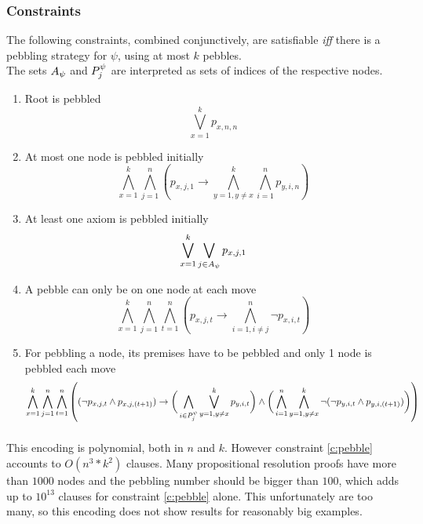 \documentclass{llncs}
\begin{document}
\subsubsection*{Constraints}
The following constraints, combined conjunctively, are satisfiable \textit{iff} there is a pebbling strategy for $\psi$, using at most $k$ pebbles.\\
The sets $A_{\psi}$ and $P_{j}^{\psi}$ are interpreted as sets of indices of the respective nodes.

\begin{enumerate}
	\item Root is pebbled
				$$\bigvee_{x = 1}^k p_{x,n,n}$$
				
	\item At most one node is pebbled initially\\
				$$\bigwedge_{x = 1}^k \bigwedge_{j = 1}^n \left( p_{x,j,1} \rightarrow \bigwedge_{y = 1, y \neq x}^k \bigwedge_{i = 1}^n p_{y,i,n} \right)$$
	
	\item At least one axiom is pebbled initially\\
				$$\bigvee_{x = 1}^k \bigvee_{j \in A_{\psi}} p_{x,j,1}$$
				
	\item A pebble can only be on one node at each move
				$$\bigwedge_{x = 1}^k \bigwedge_{j = 1}^n \bigwedge_{t = 1}^n \left( p_{x,j,t} \rightarrow \bigwedge_{i = 1, i \neq j}^n \neg p_{x,i,t} \right)$$ 
				
	\item \label{c:pebble} For pebbling a node, its premises have to be pebbled and only 1 node is pebbled each move\\
				$$\bigwedge_{x = 1}^k \bigwedge_{j = 1}^n \bigwedge_{t = 1}^n \left( (\neg p_{x,j,t} \wedge p_{x,j,(t+1)} ) \rightarrow 
					\bigg( \bigwedge_{i \in P_{j}^{\psi}} \bigvee_{y = 1, y \neq x}^k p_{y,i,t} \bigg) \wedge 
					\bigg( \bigwedge_{i = 1}^n \bigwedge_{y = 1, y \neq x}^k \neg ( \neg p_{y,i,t} \wedge p_{y,i,(t+1)} ) \bigg) \right)$$
				
\end{enumerate}
\subsubsection*{}
This encoding is polynomial, both in $n$ and $k$. However constraint \ref{c:pebble} accounts to $O(n^3*k^2)$ clauses. Many propositional resolution proofs have more than $1000$ nodes and the pebbling number should be bigger than $100$, which adds up to $10^{13}$ clauses for constraint \ref{c:pebble} alone. This unfortunately are too many, so this encoding does not show results for reasonably big examples.
\end{document}
